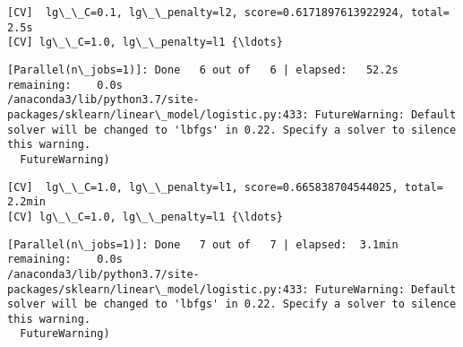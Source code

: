 \documentclass[11pt]{article}
\begin{document}
    \begin{Verbatim}[commandchars=\\\{\}]
[CV]  lg\_\_C=0.1, lg\_\_penalty=l2, score=0.6171897613922924, total=   2.5s
[CV] lg\_\_C=1.0, lg\_\_penalty=l1 {\ldots}

    \end{Verbatim}

    \begin{Verbatim}[commandchars=\\\{\}]
[Parallel(n\_jobs=1)]: Done   6 out of   6 | elapsed:   52.2s remaining:    0.0s
/anaconda3/lib/python3.7/site-packages/sklearn/linear\_model/logistic.py:433: FutureWarning: Default solver will be changed to 'lbfgs' in 0.22. Specify a solver to silence this warning.
  FutureWarning)

    \end{Verbatim}

    \begin{Verbatim}[commandchars=\\\{\}]
[CV]  lg\_\_C=1.0, lg\_\_penalty=l1, score=0.665838704544025, total= 2.2min
[CV] lg\_\_C=1.0, lg\_\_penalty=l1 {\ldots}

    \end{Verbatim}

    \begin{Verbatim}[commandchars=\\\{\}]
[Parallel(n\_jobs=1)]: Done   7 out of   7 | elapsed:  3.1min remaining:    0.0s
/anaconda3/lib/python3.7/site-packages/sklearn/linear\_model/logistic.py:433: FutureWarning: Default solver will be changed to 'lbfgs' in 0.22. Specify a solver to silence this warning.
  FutureWarning)

    \end{Verbatim}


    
    
    
    
\end{document}
